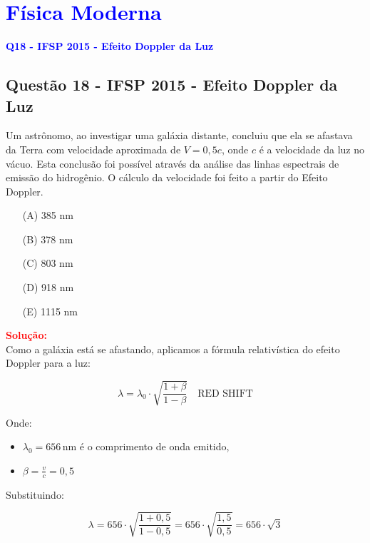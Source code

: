 \documentclass[a4paper,12pt]{article}
\begin{document}
\section{\large \textcolor{blue}{F\'isica Moderna}}

\begin{flushleft}
\textbf{\textcolor{blue}{\Large Q18 - IFSP 2015 - Efeito Doppler da Luz}}\\
\noindent

\subsection{Quest\~ao 18 - IFSP 2015 - Efeito Doppler da Luz}
Um astrônomo, ao investigar uma galáxia distante, concluiu que ela se afastava 
da Terra com velocidade aproximada de \( V = 0{,}5c \), onde \( c \) é a velocidade 
da luz no vácuo. Esta conclusão foi possível através da análise das linhas espectrais 
de emissão do hidrogênio. O cálculo da velocidade foi feito a partir do Efeito Doppler.\\

\begin{itemize}
\item[(A)] 385 nm
\item[(B)] 378 nm
\item[(C)] 803 nm
\item[(D)] 918 nm
\item[(E)] 1115 nm
\end{itemize}
\vspace{0.5cm}

\textcolor{red}{\textbf{Solução:}}\\

Como a galáxia está se afastando, aplicamos a fórmula relativística do efeito Doppler para a luz:

\[
\lambda = \lambda_0 \cdot \sqrt{\frac{1 + \beta}{1 - \beta}} \quad \text{RED SHIFT} 
\]

Onde:

\begin{itemize}
    \item \( \lambda_0 = 656\,\text{nm} \) é o comprimento de onda emitido,
    \item \( \beta = \frac{v}{c} = 0{,}5 \)
\end{itemize}

Substituindo:

\[
\lambda = 656 \cdot \sqrt{\frac{1 + 0{,}5}{1 - 0{,}5}} = 656 \cdot \sqrt{\frac{1{,}5}{0{,}5}} = 656 \cdot \sqrt{3}
\]


\end{flushleft}
\end{document}
